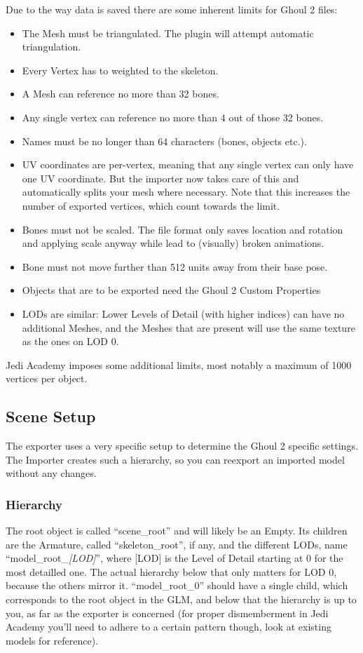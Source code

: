 \documentclass[a4paper,10pt]{article}
\begin{document}
 Due to the way data is saved there are some inherent limits for Ghoul 2 files:
 \begin{itemize}
  \item The Mesh must be triangulated. The plugin will attempt automatic triangulation.
  \item Every Vertex has to weighted to the skeleton.
  \item A Mesh can reference no more than 32 bones.
  \item Any single vertex can reference no more than 4 out of those 32 bones.
  \item Names must be no longer than 64 characters (bones, objects etc.).
  \item UV coordinates are per-vertex, meaning that any single vertex can only have one UV coordinate.
  But the importer now takes care of this and automatically splits your mesh where necessary.
  Note that this increases the number of exported vertices, which count towards the limit.
  \item Bones must not be scaled. The file format only saves location and rotation and applying scale anyway
  while lead to (visually) broken animations.
  \item Bone must not move further than 512 units away from their base pose.
  \item Objects that are to be exported need the Ghoul 2 Custom Properties
  \item LODs are similar: Lower Levels of Detail (with higher indices) can have no additional Meshes, and the
  Meshes that are present will use the same texture as the ones on LOD 0.
 \end{itemize}
 Jedi Academy imposes some additional limits, most notably a maximum of 1000 vertices per object.
 
 \subsection{Scene Setup}
 
 The exporter uses a very specific setup to determine the Ghoul 2 specific settings. The Importer creates
 such a hierarchy, so you can reexport an imported model without any changes.
 
 \subsubsection{Hierarchy}
 
 The root object is called ``scene\_root'' and will likely be an Empty. Its children are the Armature, called
 ``skeleton\_root'', if any, and the different LODs, name ``model\_root\_\emph{[LOD]}'', where [LOD] is the Level
 of Detail starting at 0 for the most detailled one. The actual hierarchy below that only matters for LOD 0,
 because the others mirror it. ``model\_root\_0'' should have a single child, which corresponds to the root
 object in the GLM, and below that the hierarchy is up to you, as far as the exporter is concerned (for proper
 dismemberment in Jedi Academy you'll need to adhere to a certain pattern though, look at existing  models
 for reference).
 
\end{document}
